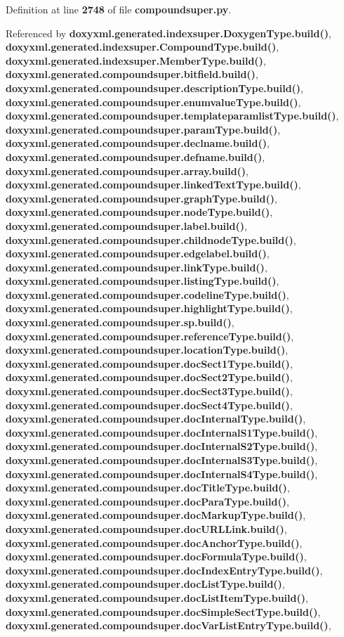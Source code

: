 Definition at line {\bf 2748} of file {\bf compoundsuper.\+py}.



Referenced by {\bf doxyxml.\+generated.\+indexsuper.\+Doxygen\+Type.\+build()}, {\bf doxyxml.\+generated.\+indexsuper.\+Compound\+Type.\+build()}, {\bf doxyxml.\+generated.\+indexsuper.\+Member\+Type.\+build()}, {\bf doxyxml.\+generated.\+compoundsuper.\+bitfield.\+build()}, {\bf doxyxml.\+generated.\+compoundsuper.\+description\+Type.\+build()}, {\bf doxyxml.\+generated.\+compoundsuper.\+enumvalue\+Type.\+build()}, {\bf doxyxml.\+generated.\+compoundsuper.\+templateparamlist\+Type.\+build()}, {\bf doxyxml.\+generated.\+compoundsuper.\+param\+Type.\+build()}, {\bf doxyxml.\+generated.\+compoundsuper.\+declname.\+build()}, {\bf doxyxml.\+generated.\+compoundsuper.\+defname.\+build()}, {\bf doxyxml.\+generated.\+compoundsuper.\+array.\+build()}, {\bf doxyxml.\+generated.\+compoundsuper.\+linked\+Text\+Type.\+build()}, {\bf doxyxml.\+generated.\+compoundsuper.\+graph\+Type.\+build()}, {\bf doxyxml.\+generated.\+compoundsuper.\+node\+Type.\+build()}, {\bf doxyxml.\+generated.\+compoundsuper.\+label.\+build()}, {\bf doxyxml.\+generated.\+compoundsuper.\+childnode\+Type.\+build()}, {\bf doxyxml.\+generated.\+compoundsuper.\+edgelabel.\+build()}, {\bf doxyxml.\+generated.\+compoundsuper.\+link\+Type.\+build()}, {\bf doxyxml.\+generated.\+compoundsuper.\+listing\+Type.\+build()}, {\bf doxyxml.\+generated.\+compoundsuper.\+codeline\+Type.\+build()}, {\bf doxyxml.\+generated.\+compoundsuper.\+highlight\+Type.\+build()}, {\bf doxyxml.\+generated.\+compoundsuper.\+sp.\+build()}, {\bf doxyxml.\+generated.\+compoundsuper.\+reference\+Type.\+build()}, {\bf doxyxml.\+generated.\+compoundsuper.\+location\+Type.\+build()}, {\bf doxyxml.\+generated.\+compoundsuper.\+doc\+Sect1\+Type.\+build()}, {\bf doxyxml.\+generated.\+compoundsuper.\+doc\+Sect2\+Type.\+build()}, {\bf doxyxml.\+generated.\+compoundsuper.\+doc\+Sect3\+Type.\+build()}, {\bf doxyxml.\+generated.\+compoundsuper.\+doc\+Sect4\+Type.\+build()}, {\bf doxyxml.\+generated.\+compoundsuper.\+doc\+Internal\+Type.\+build()}, {\bf doxyxml.\+generated.\+compoundsuper.\+doc\+Internal\+S1\+Type.\+build()}, {\bf doxyxml.\+generated.\+compoundsuper.\+doc\+Internal\+S2\+Type.\+build()}, {\bf doxyxml.\+generated.\+compoundsuper.\+doc\+Internal\+S3\+Type.\+build()}, {\bf doxyxml.\+generated.\+compoundsuper.\+doc\+Internal\+S4\+Type.\+build()}, {\bf doxyxml.\+generated.\+compoundsuper.\+doc\+Title\+Type.\+build()}, {\bf doxyxml.\+generated.\+compoundsuper.\+doc\+Para\+Type.\+build()}, {\bf doxyxml.\+generated.\+compoundsuper.\+doc\+Markup\+Type.\+build()}, {\bf doxyxml.\+generated.\+compoundsuper.\+doc\+U\+R\+L\+Link.\+build()}, {\bf doxyxml.\+generated.\+compoundsuper.\+doc\+Anchor\+Type.\+build()}, {\bf doxyxml.\+generated.\+compoundsuper.\+doc\+Formula\+Type.\+build()}, {\bf doxyxml.\+generated.\+compoundsuper.\+doc\+Index\+Entry\+Type.\+build()}, {\bf doxyxml.\+generated.\+compoundsuper.\+doc\+List\+Type.\+build()}, {\bf doxyxml.\+generated.\+compoundsuper.\+doc\+List\+Item\+Type.\+build()}, {\bf doxyxml.\+generated.\+compoundsuper.\+doc\+Simple\+Sect\+Type.\+build()}, {\bf doxyxml.\+generated.\+compoundsuper.\+doc\+Var\+List\+Entry\+Type.\+build()}, 